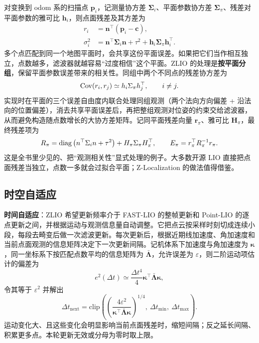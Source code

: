 对变换到 odom 系的扫描点 $\bm{p}_i$，记测量协方差 $\bm{\Sigma}_i$、平面参数协方差 $\bm{\Sigma}_\pi$、残差对平面参数的雅可比 $\bm{h}_i$，则点面残差及其方差为
\begin{align}
r_i &= \bm{n}^{\top}(\bm{p}_i-\bm{c}),\label{eq:23-residual}\\
\sigma_i^{2} &= \bm{n}^{\top}\bm{\Sigma}_i\bm{n}+\tau^{2}+\bm{h}_i\bm{\Sigma}_\pi\bm{h}_i^{\top}.
\label{eq:23-resvar}
\end{align}
多个点匹配到同一个地图平面时，会共享这份平面误差。如果把它们当作相互独立，点数越多，滤波器就越容易“过度相信”这个平面。ZLIO 的处理是\textbf{按平面分组}，保留平面参数误差带来的相关性。同组中两个不同点的残差协方差为
\begin{equation}
\operatorname{Cov}(r_i,r_j)\simeq h_i\Sigma_\pi h_j^{\top},\qquad i\ne j.
\label{eq:23-corr}
\end{equation}
实现时在平面的三个误差自由度内联合处理同组观测（两个法向方向偏差 + 沿法向的位置偏差），消去共享平面误差后，再把整组观测对位姿的约束交给滤波器，从而避免构造随点数增长的大协方差矩阵。记同平面残差向量 $\bm{r}_\pi$、雅可比 $\bm{H}_\pi$，最终残差项为
\begin{equation}
R_\pi=\operatorname{diag}\left(n^{\top}\Sigma_in+\tau^{2}\right)+H_\pi\Sigma_\pi H_\pi^{\top},\qquad
E_\pi=r_\pi^{\top}R_\pi^{-1}r_\pi.
\label{eq:23-marginal}
\end{equation}
这是全书里少见的、把“观测相关性”显式处理的例子。大多数开源 LIO 直接把点面残差当独立，点数一多就会过拟合平面；Z-Localization 的做法值得借鉴。

\subsection{时空自适应}

\textbf{时间自适应}：ZLIO 希望更新频率介于 FAST-LIO 的整帧更新和 Point-LIO 的逐点更新之间，并根据运动与观测信息量自动调整。它把点云按采样时刻切成连续小段，每段去畸变后做一次滤波更新。每次更新后，根据近期线加速度、角加速度和当前点面观测的信息矩阵决定下一次更新间隔。记机体系下加速度与角加速度为 $\bm{\kappa}$，同一坐标系下按匹配点数平均的信息矩阵为 $\bar{\bm{\Lambda}}$，允许误差为 $\varepsilon$，则二阶运动项估计的偏差为
\begin{equation}
e^{2}(\Delta t)\simeq\frac{\Delta t^{4}}{4}\bm{\kappa}^{\top}\bar{\bm{\Lambda}}\bm{\kappa},
\label{eq:23-time-err}
\end{equation}
令其等于 $\varepsilon^{2}$ 并解出
\begin{equation}
\Delta t_{\mathrm{next}}=\mathrm{clip}\left(\left(\frac{4\varepsilon^{2}}{\bm{\kappa}^{\top}\bar{\bm{\Lambda}}\bm{\kappa}}\right)^{1/4},\ \Delta t_{\min},\ \Delta t_{\max}\right).
\label{eq:23-time}
\end{equation}
运动变化大、且这些变化会明显影响当前点面残差时，缩短间隔；反之延长间隔、积累更多点。本轮更新无效或分母为零时取上限。

